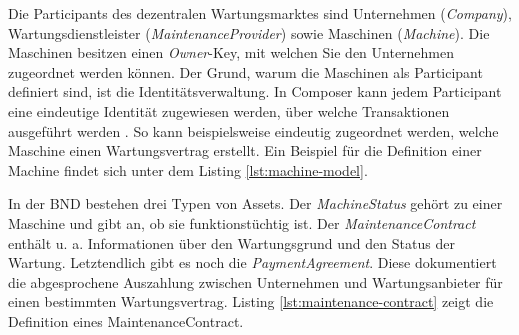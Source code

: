 Die Participants des dezentralen Wartungsmarktes sind Unternehmen (\textit{Company}), Wartungsdienstleister (\textit{MaintenanceProvider}) sowie Maschinen (\textit{Machine}). Die Maschinen besitzen einen \textit{Owner}-Key, mit welchen Sie den Unternehmen zugeordnet werden können. Der Grund, warum die Maschinen als Participant definiert sind, ist die Identitätsverwaltung. In Composer kann jedem Participant eine eindeutige Identität zugewiesen werden, über welche Transaktionen ausgeführt werden \cite{HyperledgerComposerTeamParticipantsidentitiesHyperledger}. So kann beispielsweise eindeutig zugeordnet werden, welche Maschine einen Wartungsvertrag erstellt. Ein Beispiel für die Definition einer Machine findet sich unter dem Listing \ref{lst:machine-model}.


In der \acs{BND} bestehen drei Typen von Assets. Der \textit{MachineStatus} gehört zu einer Maschine und gibt an, ob sie funktionstüchtig ist. Der \textit{MaintenanceContract} enthält u. a. Informationen über den Wartungsgrund und den Status der Wartung. Letztendlich gibt es noch die \textit{PaymentAgreement}. Diese dokumentiert die abgesprochene Auszahlung zwischen Unternehmen und Wartungsanbieter für einen bestimmten Wartungsvertrag. Listing \ref{lst:maintenance-contract} zeigt die Definition eines MaintenanceContract.


